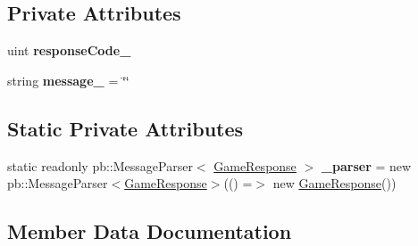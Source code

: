 \subsection*{Private Attributes}
\begin{DoxyCompactItemize}
\item 
\mbox{\label{class_coinche_1_1_google_1_1_protobuf_1_1_game_response_a1e9dd6f474c41f1eaf455cce60b17b01}} 
uint {\bfseries response\+Code\+\_\+}
\item 
\mbox{\label{class_coinche_1_1_google_1_1_protobuf_1_1_game_response_ae6621099790d0b7e23f8a21720f4de92}} 
string {\bfseries message\+\_\+} = \char`\"{}\char`\"{}
\end{DoxyCompactItemize}
\subsection*{Static Private Attributes}
\begin{DoxyCompactItemize}
\item 
\mbox{\label{class_coinche_1_1_google_1_1_protobuf_1_1_game_response_a256e831f21f2eb1331c5229ab380cee5}} 
static readonly pb\+::\+Message\+Parser$<$ \hyperlink{class_coinche_1_1_google_1_1_protobuf_1_1_game_response}{Game\+Response} $>$ {\bfseries \+\_\+parser} = new pb\+::\+Message\+Parser$<$\hyperlink{class_coinche_1_1_google_1_1_protobuf_1_1_game_response}{Game\+Response}$>$(() =$>$ new \hyperlink{class_coinche_1_1_google_1_1_protobuf_1_1_game_response}{Game\+Response}())
\end{DoxyCompactItemize}


\subsection{Member Data Documentation}
\mbox{\label{class_coinche_1_1_google_1_1_protobuf_1_1_game_response_aa71d1d3e67c2941a9a5a56d926d35585}} 
